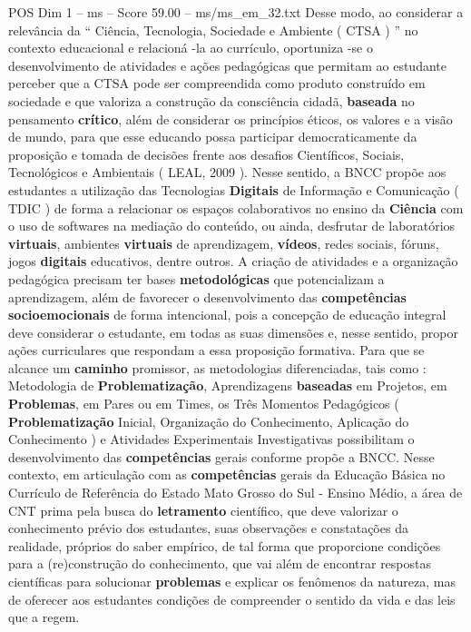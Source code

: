 \begin{textsample}{POS Dim 1 – ms – Score 59.00 – ms/ms\_em\_32.txt}
Desse modo, ao considerar a relevância da “ Ciência, Tecnologia, Sociedade e Ambiente ( CTSA ) ” no contexto educacional e relacioná -la ao currículo, oportuniza -se o desenvolvimento de atividades e ações pedagógicas que permitam ao estudante perceber que a CTSA pode ser compreendida como produto construído em sociedade e que valoriza a construção da consciência cidadã, \textbf{baseada} no pensamento \textbf{crítico}, além de considerar os princípios éticos, os valores e a visão de mundo, para que esse educando possa participar democraticamente da proposição e tomada de decisões frente aos desafios Científicos, Sociais, Tecnológicos e Ambientais ( LEAL, 2009 ).
Nesse sentido, a BNCC propõe aos estudantes a utilização das Tecnologias \textbf{Digitais} de Informação e Comunicação ( TDIC ) de forma a relacionar os espaços colaborativos no ensino da \textbf{Ciência} com o uso de softwares na mediação do conteúdo, ou ainda, desfrutar de laboratórios \textbf{virtuais}, ambientes \textbf{virtuais} de aprendizagem, \textbf{vídeos}, redes sociais, fóruns, jogos \textbf{digitais} educativos, dentre outros.
A criação de atividades e a organização pedagógica precisam ter bases \textbf{metodológicas} que potencializam a aprendizagem, além de favorecer o desenvolvimento das \textbf{competências} \textbf{socioemocionais} de forma intencional, pois a concepção de educação integral deve considerar o estudante, em todas as suas dimensões e, nesse sentido, propor ações curriculares que respondam a essa proposição formativa.
Para que se alcance um \textbf{caminho} promissor, as metodologias diferenciadas, tais como : Metodologia de \textbf{Problematização}, Aprendizagens \textbf{baseadas} em Projetos, em \textbf{Problemas}, em Pares ou em Times, os Três Momentos Pedagógicos ( \textbf{Problematização} Inicial, Organização do Conhecimento, Aplicação do Conhecimento ) e Atividades Experimentais Investigativas possibilitam o desenvolvimento das \textbf{competências} gerais conforme propõe a BNCC.
Nesse contexto, em articulação com as \textbf{competências} gerais da Educação Básica no Currículo de Referência do Estado Mato Grosso do Sul - Ensino Médio, a área de CNT prima pela busca do \textbf{letramento} científico, que deve valorizar o conhecimento prévio dos estudantes, suas observações e constatações da realidade, próprios do saber empírico, de tal forma que proporcione condições para a (re)construção do conhecimento, que vai além de encontrar respostas científicas para solucionar \textbf{problemas} e explicar os fenômenos da natureza, mas de oferecer aos estudantes condições de compreender o sentido da vida e das leis que a regem.

\end{textsample}
